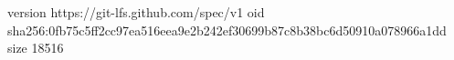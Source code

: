 version https://git-lfs.github.com/spec/v1
oid sha256:0fb75c5ff2cc97ea516eea9e2b242ef30699b87c8b38bc6d50910a078966a1dd
size 18516
